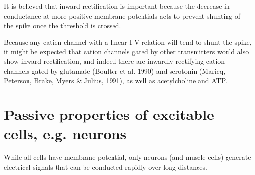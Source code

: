 It is believed that inward rectification is important because the decrease in
conductance at more positive membrane potentials acts to prevent shunting of the
spike once the threshold is crossed.

Because any cation channel with a linear I-V relation will tend to shunt the
spike, it might be expected that cation channels gated by other transmitters
would also show inward rectification, and indeed there are inwardly rectifying
cation channels gated by glutamate (Boulter et al. 1990) and serotonin (Maricq,
Peterson, Brake, Myers \& Julius, 1991), as well as acetylcholine and ATP.







\section{Passive properties of excitable cells, e.g. neurons}
\label{sec:passive-properties-excitable-cells}
\label{sec:intrinsic-properties-neuron}

While all cells have membrane potential, only neurons (and muscle cells)
generate electrical signals that can be conducted rapidly over long distances.

